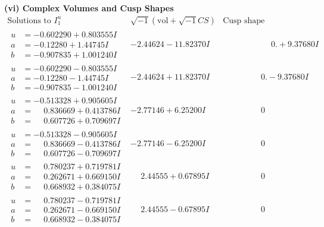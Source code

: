 \documentclass[1p]{elsarticle_modified}
\theoremstyle{definition}
\newcommand{\I}{\sqrt{-1}}
\begin{document}
\newpage\flushleft \textbf{(vi) Complex Volumes and Cusp Shapes}
$$\begin{array}{c|c|c}  
\text{Solutions to }I^u_{1}& \I (\text{vol} + \sqrt{-1}CS) & \text{Cusp shape}\\
 \hline 
\begin{aligned}
u &= -0.602290 + 0.803555 I \\
a &= -0.12280 + 1.44745 I \\
b &= -0.907835 + 1.001240 I\end{aligned}
 & -2.44624 - 11.82370 I & \phantom{-0.000000 -}0. + 9.37680 I \\ \hline\begin{aligned}
u &= -0.602290 - 0.803555 I \\
a &= -0.12280 - 1.44745 I \\
b &= -0.907835 - 1.001240 I\end{aligned}
 & -2.44624 + 11.82370 I & \phantom{-0.000000 } 0. - 9.37680 I \\ \hline\begin{aligned}
u &= -0.513328 + 0.905605 I \\
a &= \phantom{-}0.836669 + 0.413786 I \\
b &= \phantom{-}0.607726 + 0.709697 I\end{aligned}
 & -2.77146 + 6.25200 I & \phantom{-0.000000 } 0 \\ \hline\begin{aligned}
u &= -0.513328 - 0.905605 I \\
a &= \phantom{-}0.836669 - 0.413786 I \\
b &= \phantom{-}0.607726 - 0.709697 I\end{aligned}
 & -2.77146 - 6.25200 I & \phantom{-0.000000 } 0 \\ \hline\begin{aligned}
u &= \phantom{-}0.780237 + 0.719781 I \\
a &= \phantom{-}0.262671 + 0.669150 I \\
b &= \phantom{-}0.668932 + 0.384075 I\end{aligned}
 & \phantom{-}2.44555 + 0.67895 I & \phantom{-0.000000 } 0 \\ \hline\begin{aligned}
u &= \phantom{-}0.780237 - 0.719781 I \\
a &= \phantom{-}0.262671 - 0.669150 I \\
b &= \phantom{-}0.668932 - 0.384075 I\end{aligned}
 & \phantom{-}2.44555 - 0.67895 I & \phantom{-0.000000 } 0 \\ \hline\begin{aligned}

\end{aligned}
\end{array}$$
\end{document}
